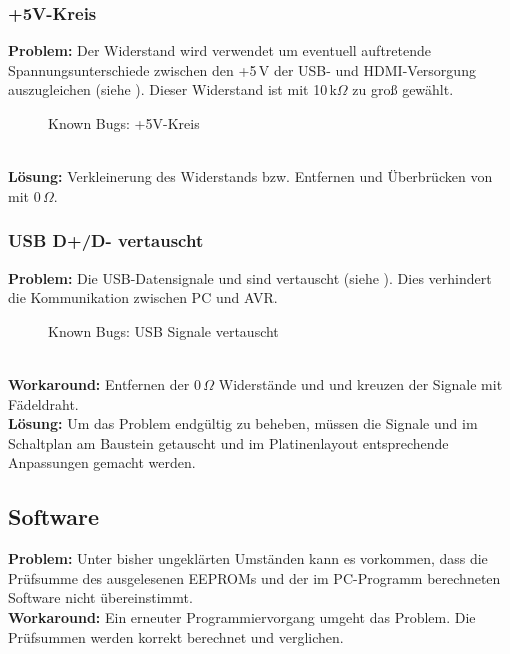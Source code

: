 \subsubsection{+5V-Kreis}
\textbf{Problem:} Der Widerstand  wird verwendet um eventuell auftretende Spannungsunterschiede zwischen den +5\,V der USB- und HDMI-Versorgung auszugleichen (siehe ). Dieser Widerstand ist mit 10\,k$\Omega$ zu groß gewählt.
\begin{figure}[htp]
	\center
    \caption{Known Bugs: +5V-Kreis}
    \label{fig:r13}
\end{figure}\\
\textbf{Lösung:} Verkleinerung des Widerstands bzw. Entfernen und Überbrücken von  mit 0\,$\Omega$.
\subsubsection{USB D+/D- vertauscht}
\textbf{Problem:} Die USB-Datensignale  und  sind vertauscht (siehe ). Dies verhindert die Kommunikation zwischen PC und AVR.
\begin{figure}[htp]
	\center
    \caption{Known Bugs: USB Signale vertauscht}
    \label{fig:usb_vertauscht}
\end{figure}\\
\textbf{Workaround:} Entfernen der 0\,$\Omega$ Widerstände  und  und kreuzen der Signale mit Fädeldraht.\\
\textbf{Lösung:} Um das Problem endgültig zu beheben, müssen die Signale  und  im Schaltplan am Baustein  getauscht und im Platinenlayout entsprechende Anpassungen gemacht werden.
\subsection{Software}
\textbf{Problem:} Unter bisher ungeklärten Umständen kann es vorkommen, dass die Prüfsumme des ausgelesenen EEPROMs und der im PC-Programm berechneten Software nicht übereinstimmt. \\
\textbf{Workaround:} Ein erneuter Programmiervorgang umgeht das Problem. Die Prüfsummen werden korrekt berechnet und verglichen.